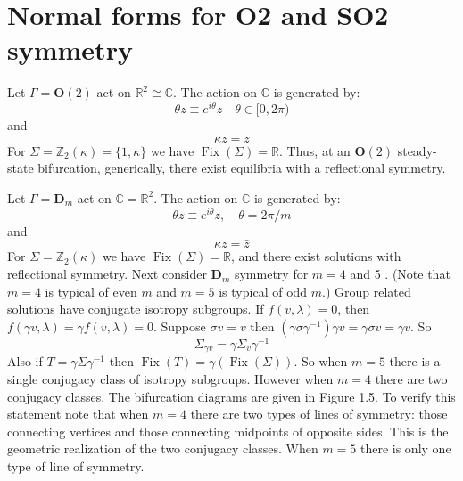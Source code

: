 \documentclass{scrartcl}
\begin{document}
  \section{Normal forms for O2 and SO2 symmetry}
    \begin{example}\label{notes_normal_forms:ex:1.33}
      Let \(\Gamma=\mathbf{O}(2)\) act on \(\mathbb{R}^{2} \cong \mathbb{C}\).
      The action on \(\mathbb{C}\) is generated by:
      \begin{equation*}
        \theta z \equiv e^{i \theta} z \quad \theta \in[0, 2 \pi)
      \end{equation*}
      and
      \begin{equation*}
        \kappa z=\bar{z}
      \end{equation*}
      For \(\Sigma=\mathbb{Z}_{2}(\kappa)=\{1, \kappa\}\) we have \(\operatorname{Fix}(\Sigma)=\mathbb{R}\).
      Thus, at an \(\mathbf{O}(2)\) steady-state bifurcation, generically, there exist equilibria with a reflectional symmetry.
    \end{example}
    \begin{example}\label{notes_normal_forms:ex:1.34}
      Let \(\Gamma=\mathbf{D}_{m}\) act on \(\mathbb{C}=\mathbb{R}^{2}\).
      The action on \(\mathbb{C}\) is generated by:
      \begin{equation*}
        \theta z \equiv e^{i \theta} z, \quad \theta = 2 \pi / m
      \end{equation*}
      and
      \begin{equation*}
        \kappa z=\bar{z}
      \end{equation*}
      For \(\Sigma=\mathbb{Z}_{2}(\kappa)\) we have \(\operatorname{Fix}(\Sigma)=\mathbb{R}\), and there exist solutions with reflectional symmetry.
      Next consider \(\mathbf{D}_{m}\) symmetry for \(m = 4\) and 5 .
      (Note that \(m = 4\) is typical of even \(m\) and \(m = 5\) is typical of odd \(m\).)
      Group related solutions have conjugate isotropy subgroups.
      If \(f(v, \lambda)=0\), then \(f(\gamma v, \lambda)=\gamma f(v, \lambda)=0\).
      Suppose \(\sigma v = v\) then \(\left(\gamma \sigma \gamma^{-1}\right) \gamma v=\gamma \sigma v=\gamma v\).
      So
      \begin{equation*}
        \Sigma_{\gamma v}=\gamma \Sigma_{v} \gamma^{-1}
      \end{equation*}
      Also if \(T=\gamma \Sigma \gamma^{-1}\) then \(\operatorname{Fix}(T)=\gamma(\operatorname{Fix}(\Sigma))\).
      So when \(m = 5\) there is a single conjugacy class of isotropy subgroups.
      However when \(m = 4\) there are two conjugacy classes.
      The bifurcation diagrams are given in Figure 1.5.
      To verify this statement note that when \(m = 4\) there are two types of lines of symmetry: those connecting vertices and those connecting midpoints of opposite sides.
      This is the geometric realization of the two conjugacy classes.
      When \(m = 5\) there is only one type of line of symmetry.
    \end{example}
\end{document}
